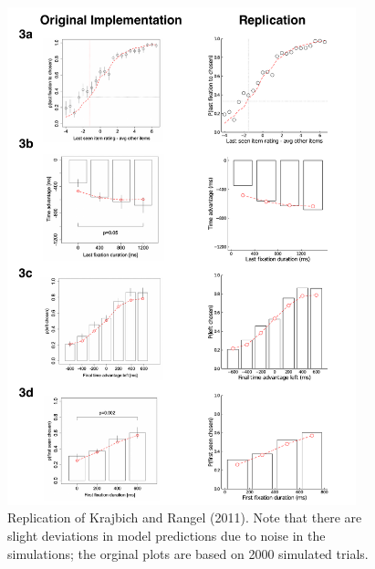 \begin{figure}[tb!]
  \centering
  \includegraphics[width=0.9\textwidth]{figs/attention/supp-addm-replication-trinary.pdf}
  \caption{Replication of Krajbich and Rangel (2011). Note that there are slight deviations in model predictions due to noise in the simulations; the orginal plots are based on 2000 simulated trials.
  }
  \label{fig:attention-addm3}
\end{figure}

\clearpage


